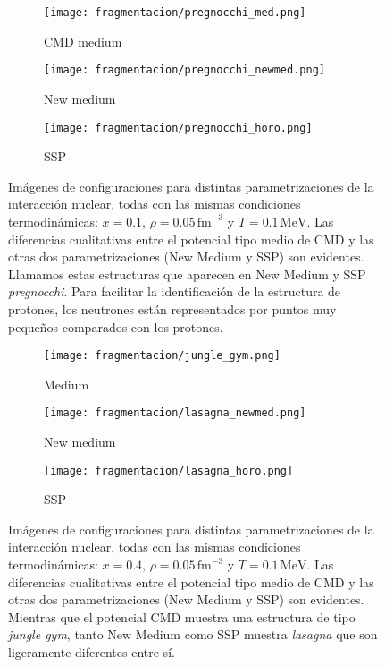 \begin{figure*}
  \begin{subfigure}{.3\linewidth}
    \texttt{[image: fragmentacion/pregnocchi\_med.png]}
    \caption{CMD medium}
  \end{subfigure}
  \begin{subfigure}{.3\linewidth}
    \texttt{[image: fragmentacion/pregnocchi\_newmed.png]}
    \caption{New medium}
  \end{subfigure}
  \begin{subfigure}{.3\linewidth}
    \texttt{[image: fragmentacion/pregnocchi\_horo.png]}
    \caption{SSP}
  \end{subfigure}
  \caption{Imágenes de configuraciones para distintas parametrizaciones de la interacción nuclear, todas con las mismas condiciones termodinámicas: $x = 0.1$, $\rho = 0.05\,\text{fm}^{-3}$ y $T = 0.1\,\text{MeV}$.
    Las diferencias cualitativas entre el potencial tipo medio de CMD y las otras dos parametrizaciones (New Medium y SSP) son evidentes.
    Llamamos estas estructuras que aparecen en New Medium y SSP \emph{pregnocchi}.
    Para facilitar la identificación de la estructura de protones, los neutrones están representados por puntos muy pequeños comparados con los protones.}
\label{fig:x01_potentials}
\end{figure*}

\begin{figure*}
  \begin{subfigure}{.3\linewidth}
    \texttt{[image: fragmentacion/jungle\_gym.png]}
    \caption{Medium}
  \end{subfigure}
  \begin{subfigure}{.3\linewidth}
    \texttt{[image: fragmentacion/lasagna\_newmed.png]}
    \caption{New medium}
  \end{subfigure}
  \begin{subfigure}{.3\linewidth}
    \texttt{[image: fragmentacion/lasagna\_horo.png]}
    \caption{SSP}
  \end{subfigure}
  \caption{Imágenes de configuraciones para distintas parametrizaciones de la interacción nuclear, todas con las mismas condiciones termodinámicas: $x = 0.4$, $\rho = 0.05\,\text{fm}^{-3}$ y $T = 0.1\,\text{MeV}$.
    Las diferencias cualitativas entre el potencial tipo medio de CMD y las otras dos parametrizaciones (New Medium y SSP) son evidentes.
    Mientras que el potencial CMD muestra una estructura de tipo \emph{jungle gym}, tanto New Medium como SSP muestra \emph{lasagna} que son ligeramente diferentes entre sí.}
\label{fig:x04_potentials}
\end{figure*}


